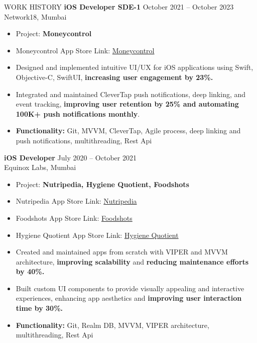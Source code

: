 \documentclass{resume} %
\begin{document}
\begin{rSection}{WORK HISTORY}
\textbf{iOS Developer SDE-1} \hfill October 2021 -- October 2023\\
Network18, Mumbai
\begin{itemize}
    \itemsep -3pt
    \item Project: \textbf{Moneycontrol}
    \item Moneycontrol App Store Link: \href{https://apps.apple.com/in/app/moneycontrol-marketsnews/id408654600}{Moneycontrol}
    \item Designed and implemented intuitive UI/UX for iOS applications using Swift, Objective-C, SwiftUI, \textbf{increasing user engagement by 23\%.}
    \item Integrated and maintained CleverTap push notifications, deep linking, and event tracking, \textbf{improving user retention by 25\% and automating 100K+ push notifications monthly}.
    \item \textbf{Functionality:} Git, MVVM, CleverTap, Agile process, deep linking and push notifications, multithreading, Rest Api
\end{itemize}

\newpage
\textbf{iOS Developer} \hfill July 2020 -- October 2021\\
Equinox Labs, Mumbai
\begin{itemize}
    \itemsep -3pt
    \item Project: \textbf{Nutripedia, Hygiene Quotient, Foodshots}
    \item Nutripedia App Store Link: \href{https://apps.apple.com/us/app/id1527966157}{Nutripedia}
    \item Foodshots App Store Link: \href{https://apps.apple.com/us/app/foodshots-daily-newsupdate/id1459858249}{Foodshots}
    \item Hygiene Quotient App Store Link: \href{https://apps.apple.com/in/app/hygiene-quotient/id1535190924?ignmpt=uo%3D4}{Hygiene Quotient}
    \item Created and maintained apps from scratch with VIPER and MVVM architecture, \textbf{improving scalability} and \textbf{reducing maintenance efforts by 40\%.}
    \item Built custom UI components to provide visually appealing and interactive experiences, enhancing app aesthetics and \textbf{improving user interaction time by 30\%.}
    \item \textbf{Functionality:} Git, Realm DB, MVVM, VIPER architecture, multithreading, Rest Api
\end{itemize}



\end{rSection}
\end{document}
